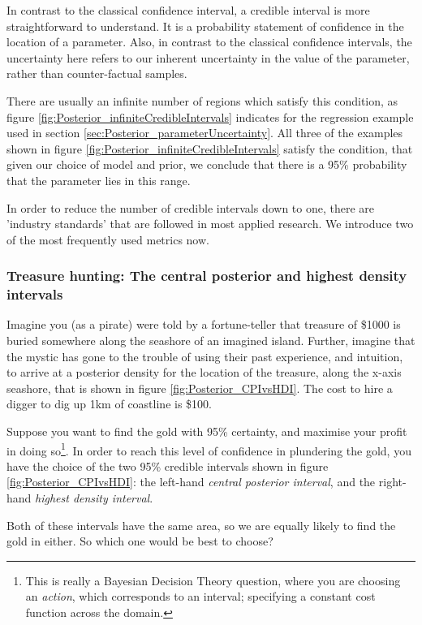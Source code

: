 \documentclass[11pt,fullpage]{book}
\begin{document}
In contrast to the classical confidence interval, a credible interval is more straightforward to understand. It is a probability statement of confidence in the location of a parameter. Also, in contrast to the classical confidence intervals, the uncertainty here refers to our inherent uncertainty in the value of the parameter, rather than counter-factual samples.

There are usually an infinite number of regions which satisfy this condition, as figure \ref{fig:Posterior_infiniteCredibleIntervals} indicates for the regression example used in section \ref{sec:Posterior_parameterUncertainty}. All three of the examples shown in figure \ref{fig:Posterior_infiniteCredibleIntervals} satisfy the condition, that given our choice of model and prior, we conclude that there is a 95\% probability that the parameter lies in this range. 

In order to reduce the number of credible intervals down to one, there are 'industry standards' that are followed in most applied research. We introduce two of the most frequently used metrics now.

\subsubsection{Treasure hunting: The central posterior and highest density intervals}\label{sec:Posterior_CPI}\label{sec:Posterior_HDI}
Imagine you (as a pirate) were told by a fortune-teller that treasure of \$1000 is buried somewhere along the seashore of an imagined island. Further, imagine that the mystic has gone to the trouble of using their past experience, and intuition, to arrive at a posterior density for the location of the treasure, along the x-axis seashore, that is shown in figure \ref{fig:Posterior_CPIvsHDI}. The cost to hire a digger to dig up 1km of coastline is \$100.

Suppose you want to find the gold with 95\% certainty, and maximise your profit in doing so\footnote{This is really a Bayesian Decision Theory question, where you are choosing an \textit{action}, which corresponds to an interval; specifying a constant cost function across the domain.}. In order to reach this level of confidence in plundering the gold, you have the choice of the two 95\% credible intervals shown in figure \ref{fig:Posterior_CPIvsHDI}: the left-hand \textit{central posterior interval}, and the right-hand \textit{highest density interval}.

Both of these intervals have the same area, so we are equally likely to find the gold in either. So which one would be best to choose?
\end{document}
